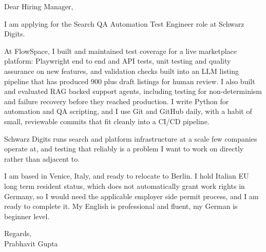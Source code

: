 \documentclass[a4paper,11pt]{article}
\begin{document}
Dear Hiring Manager,

I am applying for the Search QA Automation Test Engineer role at Schwarz Digits.

At FlowSpace, I built and maintained test coverage for a live marketplace platform: Playwright end to end and API tests, unit testing and quality assurance on new features, and validation checks built into an LLM listing pipeline that has produced 900 plus draft listings for human review. I also built and evaluated RAG backed support agents, including testing for non-determinism and failure recovery before they reached production. I write Python for automation and QA scripting, and I use Git and GitHub daily, with a habit of small, reviewable commits that fit cleanly into a CI/CD pipeline.

Schwarz Digits runs search and platform infrastructure at a scale few companies operate at, and testing that reliably is a problem I want to work on directly rather than adjacent to.

I am based in Venice, Italy, and ready to relocate to Berlin. I hold Italian EU long term resident status, which does not automatically grant work rights in Germany, so I would need the applicable employer side permit process, and I am ready to complete it. My English is professional and fluent, my German is beginner level.

Regards,\\
Prabhavit Gupta
\end{document}
